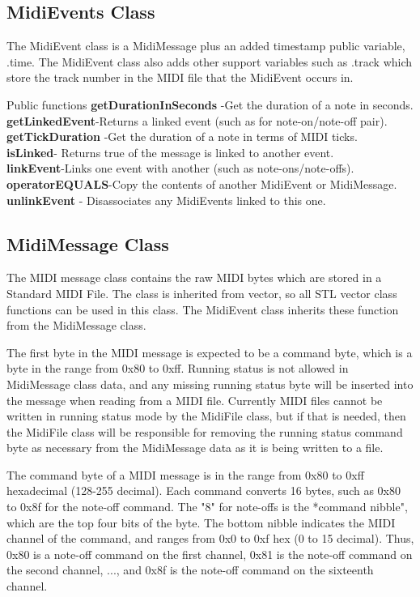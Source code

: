 \documentclass[12pt,a4paper]{article}
\begin{document}
 
 \subsection{MidiEvents Class }
 The MidiEvent class is a MidiMessage plus an added timestamp public variable, .time. The MidiEvent class also adds other support variables such as .track which store the track number in the MIDI file that the MidiEvent occurs in.

 

Public functions
 \textbf{getDurationInSeconds }-Get the duration of a note in seconds.\\
 \textbf{getLinkedEvent}-Returns a linked event (such as for note-on/note-off pair).\\
 \textbf{getTickDuration} -Get the duration of a note in terms of MIDI ticks.\\
 \textbf{isLinked}- Returns true of the message is linked to another event.\\
 \textbf{linkEvent}-Links one event with another (such as note-ons/note-offs).\\
 \textbf{operatorEQUALS}-Copy the contents of another MidiEvent or MidiMessage.\\
 \textbf{unlinkEvent }- Disassociates any MidiEvents linked to this one.\\

\subsection{MidiMessage Class }
The MIDI message class contains the raw MIDI bytes which are stored in a Standard MIDI File. The class is inherited from vector, so all STL vector class functions can be used in this class. The MidiEvent class inherits these function from the MidiMessage class.

The first byte in the MIDI message is expected to be a command byte, which is a byte in the range from 0x80 to 0xff. Running status is not allowed in MidiMessage class data, and any missing running status byte will be inserted into the message when reading from a MIDI file. Currently MIDI files cannot be written in running status mode by the MidiFile class, but if that is needed, then the MidiFile class will be responsible for removing the running status command byte as necessary from the MidiMessage data as it is being written to a file.

The command byte of a MIDI message is in the range from 0x80 to 0xff hexadecimal (128-255 decimal). Each command converts 16 bytes, such as 0x80 to 0x8f for the note-off command. The "8" for note-offs is the *command nibble", which are the top four bits of the byte. The bottom nibble indicates the MIDI channel of the command, and ranges from 0x0 to 0xf hex (0 to 15 decimal). Thus, 0x80 is a note-off command on the first channel, 0x81 is the note-off command on the second channel, ..., and 0x8f is the note-off command on the sixteenth channel.
\end{document}
